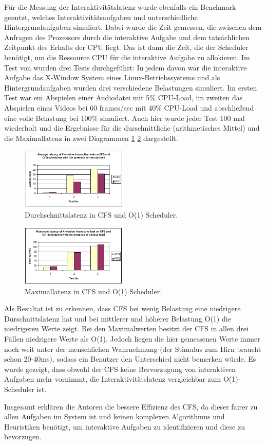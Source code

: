 Für die Messung der Interaktivitätslatenz wurde ebenfalls ein Benchmark genutzt, welches Interaktivitätsaufgaben und unterschiedliche Hintergrundaufgaben simuliert. Dabei wurde die Zeit gemessen, die zwischen dem Anfragen des Prozessors durch die interaktive Aufgabe und dem tatsächlichen Zeitpunkt des Erhalts der CPU liegt. Das ist dann die Zeit, die der Scheduler benötigt, um die Ressource CPU für die interaktive Aufgabe zu allokieren. Im Test von \cite{papercomparison} wurden drei Tests durchgeführt: In jedem davon war die interaktive Aufgabe das X-Window System eines Linux-Betriebssystems und als Hintergrundaufgaben wurden drei verschiedene Belastungen simuliert. Im ersten Test war ein Abspielen einer Audiodatei mit 5\% CPU-Load, im zweiten das Abspielen eines Videos bei 60 frames/sec mit 40\% CPU-Load und abschließend eine volle Belastung bei 100\% simuliert. Auch hier wurde jeder Test 100 mal wiederholt und die Ergebnisse für die durschnittliche (arithmetisches Mittel) und die Maximallatenz in zwei Diagrammen \ref{fig:avg_latency} \ref{fig:max_latency} dargestellt. 
\begin{figure} [h]
 	\centering
 	\includegraphics[width=0.45\textwidth]{pictures/avg_latency.png}
 	\caption{Durchschnittslatenz in CFS und O(1) Scheduler.}
 	\label{fig:avg_latency}
\end{figure}

\begin{figure} [h]
 	\centering
 	\includegraphics[width=0.45\textwidth]{pictures/max_latency.png}
 	\caption{Maximallatenz in CFS und O(1) Scheduler.}
 	\label{fig:max_latency}
\end{figure}
Als Resultat ist zu erkennen, dass CFS bei wenig Belastung eine niedrigere Durschnittslatenz hat und bei mittlerer und höherer Belastung O(1) die niedrigeren Werte zeigt. Bei den Maximalwerten besitzt der CFS in allen drei Fällen niedrigere Werte als O(1). Jedoch liegen die hier gemessenen Werte immer noch weit unter der menschlichen Wahrnehmung (der Stimulus zum Hirn braucht schon 20-40ms), sodass ein Benutzer den Unterschied nicht bemerken würde. Es wurde gezeigt, dass obwohl der CFS keine Bervorzugung von interaktiven Aufgaben mehr vornimmt, die Interaktivitätslatenz vergleichbar zum O(1)-Scheduler ist. 

Insgesamt erklären die Autoren die bessere Effizienz des CFS, da dieser fairer zu allen Aufgaben im System ist und keinen komplexen Algorithmus und Heuristiken benötigt, um interaktive Aufgaben zu identifizieren und diese zu bevorzugen.